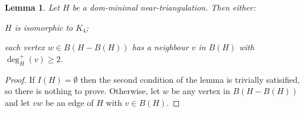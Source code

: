 \documentclass{article}
\newtheorem{lem}{Lemma}
\theoremstyle{definition}
\begin{document}
\begin{lem}\label{degree_2_outer_neighbour}
  Let $H$ be a dom-minimal near-triangulation. Then either:
  \begin{compactenum}
    \item $H$ is isomorphic to $K_4$;
    \item each vertex $w\in B(H-B(H))$ has a neighbour $v$ in $B(H)$ with $\deg^+_H(v)\ge 2$.
  \end{compactenum}
\end{lem}

\begin{proof}
  If $I(H)=\emptyset$ then the second condition of the lemma is trivially satisified, so there is nothing to prove. Otherwise, let $w$ be any vertex in $B(H-B(H))$ and let $vw$ be an edge of $H$ with $v\in B(H)$.


\end{proof}
\end{document}
